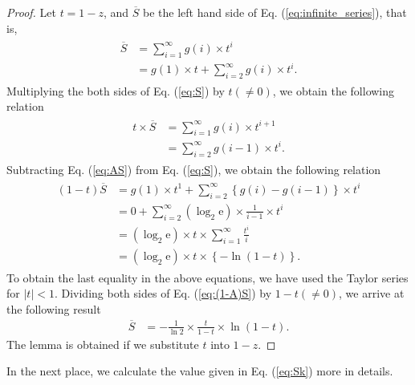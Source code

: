 \begin{proof}
Let $t=1-z$, and $\overline{S}$ be the left hand side of Eq. (\ref{eq:infinite_series}), that is,
\begin{align}\begin{split}\label{eq:S}
  \overline{S} &= \sum_{i=1}^{\infty} g(i) \times t^i \\
    &= g(1)\times t +  \sum_{i=2}^{\infty} g(i) \times t^{i}.
\end{split}\end{align}
Multiplying the both sides of Eq. (\ref{eq:S}) by $t(\neq 0)$, we obtain the following relation
\begin{align}\begin{split}\label{eq:AS}
  t\times \overline{S} &= \sum_{i=1}^{\infty} g(i) \times t^{i+1} \\
  &= \sum_{i=2}^{\infty} g(i-1) \times t^{i}.
\end{split}\end{align}
Subtracting Eq. (\ref{eq:AS}) from Eq. (\ref{eq:S}), we obtain the following relation
\begin{align}\begin{split}\label{eq:(1-A)S}
  (1-t)\overline{S} &= g(1)\times t^{1} + \sum_{i=2}^{\infty} \left\{ g(i)-g(i-1) \right\} \times t^{i} \\
  &=0 + \sum_{i=2}^{\infty} (\log_2 \mathrm{e}) \times \frac{1}{i-1} \times t^{i} \\
  &=(\log_2 \mathrm{e})\times t \times \sum_{i=1}^{\infty} \frac{t^{i}}{i} \\
  &=(\log_2 \mathrm{e})\times t \times \left\{ - \ln (1-t) \right\}.
\end{split}\end{align}
To obtain the last equality in the above equations, we have used the Taylor series for $|t| < 1$.
Dividing both sides of Eq. (\ref{eq:(1-A)S}) by $1-t (\neq 0)$, we arrive at the following result
\begin{align}
  \overline{S} &= -\frac{1}{\ln 2} \times \frac{t}{1-t} \times \ln (1-t).
\end{align}
The lemma is obtained if we substitute $t$ into $1-z$.
\end{proof}
\par
In the next place, we calculate the value given in Eq. (\ref{eq:Sk}) more in details.
